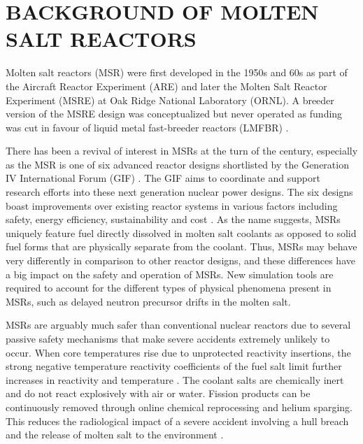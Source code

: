 \documentclass{anstrans}
\begin{document}
\section{BACKGROUND OF MOLTEN SALT REACTORS}


Molten salt reactors (MSR) were first developed in the 1950s and 60s as part of the Aircraft Reactor Experiment (ARE) and later the Molten Salt Reactor Experiment (MSRE) at Oak Ridge National Laboratory (ORNL). A breeder version of the MSRE design was conceptualized but never operated as funding was cut in favour of liquid metal fast-breeder reactors (LMFBR) \cite{macpherson_molten_1985}.

There has been a revival of interest in MSRs at the turn of the century, especially as the MSR is one of six advanced reactor designs shortlisted by the Generation IV International Forum (GIF) \cite{doe_technology_2002}. The GIF aims to coordinate and support research efforts into these next generation nuclear power designs. The six designs boast improvements over existing reactor systems in various factors including safety, energy efficiency, sustainability and cost \cite{doe_technology_2002}. As the name suggests, MSRs uniquely feature fuel directly dissolved in molten salt coolants as opposed to solid fuel forms that are physically separate from the coolant. Thus, MSRs may behave very differently in comparison to other reactor designs, and these differences have a big impact on the safety and operation of MSRs. New simulation tools are required to account for the different types of physical phenomena present in MSRs, such as delayed neutron precursor drifts in the molten salt.

MSRs are arguably much safer than conventional nuclear reactors due to several passive safety mechanisms that make severe accidents extremely unlikely to occur. When core temperatures rise due to unprotected reactivity insertions, the strong negative temperature reactivity coefficients of the fuel salt limit further increases in reactivity and temperature \cite{elsheikh_safety_2013}. The coolant salts are chemically inert and do not react explosively with air or water. Fission products can be continuously removed through online chemical reprocessing and helium sparging. This reduces the radiological impact of a severe accident involving a hull breach and the release of molten salt to the environment \cite{elsheikh_safety_2013}.
\end{document}

